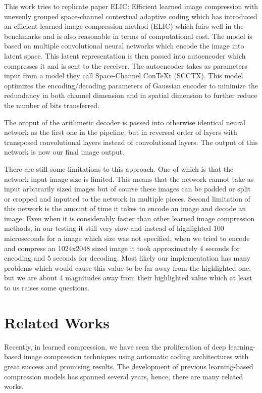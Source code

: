 \documentclass{article}
\begin{document}
This work tries to replicate paper ELIC: Efficient learned image compression with unevenly grouped space-channel contextual adaptive coding \cite{ELIC} which has introduced an efficient learned image compression method (ELIC) which fairs well in the benchmarks and is also reasonable in terms of computational cost.
The model is based on multiple convolutional neural networks which encode the image into latent space.
This latent representation is then passed into autoencoder which compresses it and is sent to the receiver. 
The autoencoder takes as parameters input from a model they call Space-Channel ConTeXt (SCCTX).
This model optimizes the encoding/decoding parameters of Gaussian encoder to minimize the redundancy in both channel dimension and in spatial dimension to further reduce the number of bits transferred.

The output of the arithmetic decoder is passed into otherwise identical neural network as the first one in the pipeline, but in reversed order of layers with transposed convolutional layers instead of convolutional layers.
The output of this network is now our final image output. 

There are still some limitations to this approach. 
One of which is that the network input image size is limited.
This means that the network cannot take as input arbitrarily sized images but of course these images can be padded or split or cropped and inputted to the network in multiple pieces.
Second limitation of this network is the amount of time it takes to encode an image and decode an image. 
Even when it is considerably faster than other learned image compression methods, in our testing it still very slow and instead of highlighted 100 microseconds for a image which size was not specified, when we tried to encode and compress an 1024x2048 sized image it took approximately 4 seconds for encoding and 5 seconds for decoding.
Most likely our implementation has many problems which would cause this value to be far away from the highlighted one, but we are about 4 magnitudes away from their highlighted value which at least to us raises some questions.


\section{Related Works}
\label{sec:related_works}
Recently, in learned compression, we have seen the proliferation of deep learning-based image compression techniques using automatic coding architectures with great success and promising results. The development of previous learning-based compression models has spanned several years, hence, there are many related works. 
\end{document}
